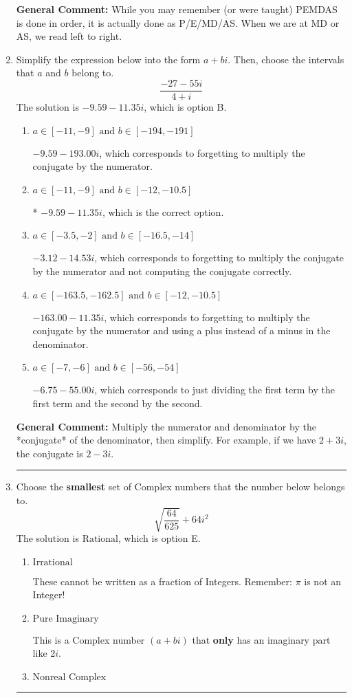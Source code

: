 \documentclass{extbook}[14pt]
\newcommand{\litem}[1]{\item #1

\rule{\textwidth}{0.4pt}}
\begin{document}
\begin{enumerate}
{\textbf{General Comment:} While you may remember (or were taught) PEMDAS is done in order, it is actually done as P/E/MD/AS. When we are at MD or AS, we read left to right.
}
\litem{
Simplify the expression below into the form $a+bi$. Then, choose the intervals that $a$ and $b$ belong to.
\[ \frac{-27 - 55 i}{4 + i} \]The solution is \( -9.59  - 11.35 i \), which is option B.\begin{enumerate}[label=\Alph*.]
\item \( a \in [-11, -9] \text{ and } b \in [-194, -191] \)

 $-9.59  - 193.00 i$, which corresponds to forgetting to multiply the conjugate by the numerator.
\item \( a \in [-11, -9] \text{ and } b \in [-12, -10.5] \)

* $-9.59  - 11.35 i$, which is the correct option.
\item \( a \in [-3.5, -2] \text{ and } b \in [-16.5, -14] \)

 $-3.12  - 14.53 i$, which corresponds to forgetting to multiply the conjugate by the numerator and not computing the conjugate correctly.
\item \( a \in [-163.5, -162.5] \text{ and } b \in [-12, -10.5] \)

 $-163.00  - 11.35 i$, which corresponds to forgetting to multiply the conjugate by the numerator and using a plus instead of a minus in the denominator.
\item \( a \in [-7, -6] \text{ and } b \in [-56, -54] \)

 $-6.75  - 55.00 i$, which corresponds to just dividing the first term by the first term and the second by the second.
\end{enumerate}

\textbf{General Comment:} Multiply the numerator and denominator by the *conjugate* of the denominator, then simplify. For example, if we have $2+3i$, the conjugate is $2-3i$.
}
\litem{
Choose the \textbf{smallest} set of Complex numbers that the number below belongs to.
\[ \sqrt{\frac{64}{625}} + 64i^2 \]The solution is \( \text{Rational} \), which is option E.\begin{enumerate}[label=\Alph*.]
\item \( \text{Irrational} \)

These cannot be written as a fraction of Integers. Remember: $\pi$ is not an Integer!
\item \( \text{Pure Imaginary} \)

This is a Complex number $(a+bi)$ that \textbf{only} has an imaginary part like $2i$.
\item \( \text{Nonreal Complex} \)


\end{enumerate}}
\end{enumerate}
\end{document}

